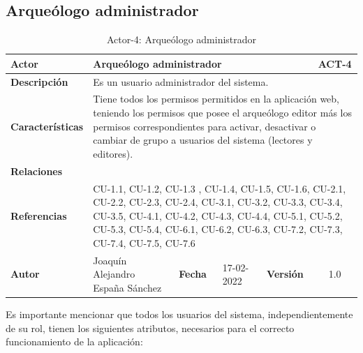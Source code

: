 \subsection{Arqueólogo administrador}
    \begin{table}[H]
    \begin{center}
        \begin{adjustbox}{width=\textwidth}
        \begin{tabular}{ | l | l | l | l | c | c | } 
            \hline
            \textbf{Actor} & \multicolumn{4}{l|}{ Arqueólogo administrador} & \cellcolor{gray!50} \textbf{ACT-4}\\
            \hline
            \textbf{Descripción} & \multicolumn{5}{p{0.9\linewidth}|}{Es un usuario
            administrador del sistema.} \\
            \hline
            \textbf{Características} & \multicolumn{5}{p{0.9\linewidth}|}{Tiene todos los
            permisos permitidos en la aplicación web, teniendo los permisos que posee el
            arqueólogo editor más los permisos correspondientes para activar, desactivar o
            cambiar de grupo a usuarios del sistema (lectores y editores).} \\
            \hline
            \textbf{Relaciones} & \multicolumn{5}{p{0.9\linewidth}|}{ } \\
            \hline
            \textbf{Referencias} & \multicolumn{5}{p{0.9\linewidth}|}{CU-1.1, CU-1.2, CU-1.3 , 
            CU-1.4, CU-1.5, CU-1.6, CU-2.1, CU-2.2, CU-2.3, CU-2.4, CU-3.1, CU-3.2, CU-3.3,
            CU-3.4, CU-3.5, CU-4.1, CU-4.2, CU-4.3, CU-4.4, CU-5.1, CU-5.2, CU-5.3, CU-5.4,
            CU-6.1, CU-6.2, CU-6.3, CU-7.2, CU-7.3, CU-7.4, CU-7.5, CU-7.6} \\
            \hline
            \textbf{Autor} & \multicolumn{1}{p{0.25\linewidth}|}{Joaquín Alejandro España Sánchez} & \textbf{Fecha} & 
            17-02-2022     & \textbf{Versión}                                                      & 1.0\\
            \hline
        \end{tabular}
        \end{adjustbox}
        \caption{Actor-4: Arqueólogo administrador}
        \label{tab:archaeologist-administrator}
    \end{center}
    \end{table}

Es importante mencionar que todos los usuarios del sistema, independientemente de su rol,
tienen los siguientes atributos, necesarios para el correcto funcionamiento de la aplicación:

